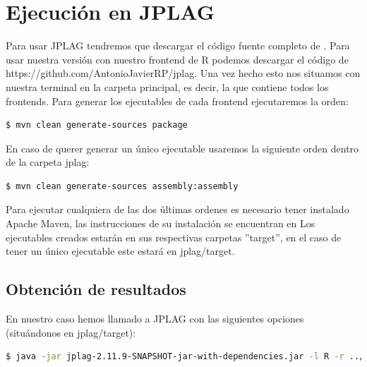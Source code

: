 \bigskip
\section{Ejecución en JPLAG}

Para usar JPLAG tendremos que descargar el código fuente completo de \cite{jplag_github}. Para usar nuestra versión con nuestro frontend de R podemos descargar el código de https://github.com/AntonioJavierRP/jplag.
\newline
Una vez hecho esto nos situamos con nuestra terminal en la carpeta principal, es decir, la que contiene todos los frontends. Para generar los ejecutables de cada frontend ejecutaremos la orden:
\begin{center}
\begin{lstlisting}[language=bash]
$ mvn clean generate-sources package
\end{lstlisting}
\end{center}
En caso de querer generar un único ejecutable usaremos la siguiente orden dentro de la carpeta jplag:
\begin{center}
\begin{lstlisting}[language=bash]
$ mvn clean generate-sources assembly:assembly
\end{lstlisting}
\end{center}
Para ejecutar cualquiera de las dos últimas ordenes es necesario tener instalado Apache Maven, las instrucciones de su instalación se encuentran en \cite{instalacion_maven}
\newline
Los ejecutables creados estarán en sus respectivas carpetas ''target'', en el caso de tener un único ejecutable este estará en jplag/target.
\newline

\subsection{Obtención de resultados}

En nuestro caso hemos llamado a JPLAG con las siguientes opciones (situándonos en jplag/target):

\begin{center}
\begin{lstlisting}[language=bash]
$ java -jar jplag-2.11.9-SNAPSHOT-jar-with-dependencies.jar -l R -r ../resultados/Entrega_X/ -s <ruta_directorio_entrega_X>
\end{lstlisting}
\end{center}

